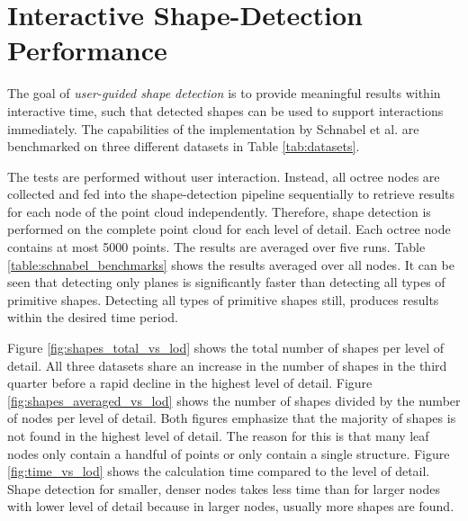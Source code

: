 \section{Interactive Shape-Detection Performance}
\label{sec:shape_detection_performance}

The goal of \textit{user-guided shape detection} is to provide meaningful results within interactive time, such that detected shapes can be used to support interactions immediately. The capabilities of the implementation by Schnabel et al. \cite{schnabel-2007-software} are benchmarked on three different datasets in Table \ref{tab:datasets}. 

\par

The tests are performed without user interaction. Instead, all octree nodes are collected and fed into the shape-detection pipeline sequentially to retrieve results for each node of the point cloud independently. Therefore, shape detection is performed on the complete point cloud for each level of detail. Each octree node contains at most 5000 points. The results are averaged over five runs. Table \ref{table:schnabel_benchmarks} shows the results averaged over all nodes. It can be seen that detecting only planes is significantly faster than detecting all types of primitive shapes. Detecting all types of primitive shapes still, produces results within the desired time period. 

\par

Figure \ref{fig:shapes_total_vs_lod} shows the total number of shapes per level of detail. All three datasets share an increase in the number of shapes in the third quarter before a rapid decline in the highest level of detail. 
Figure \ref{fig:shapes_averaged_vs_lod} shows the number of shapes divided by the number of nodes per level of detail. Both figures emphasize that the majority of shapes is not found in the highest level of detail. The reason for this is that many leaf nodes only contain a handful of points or only contain a single structure. 
Figure \ref{fig:time_vs_lod} shows the calculation time compared to the level of detail. Shape detection for smaller, denser nodes takes less time than for larger nodes with lower level of detail because in larger nodes, usually more shapes are found. 

